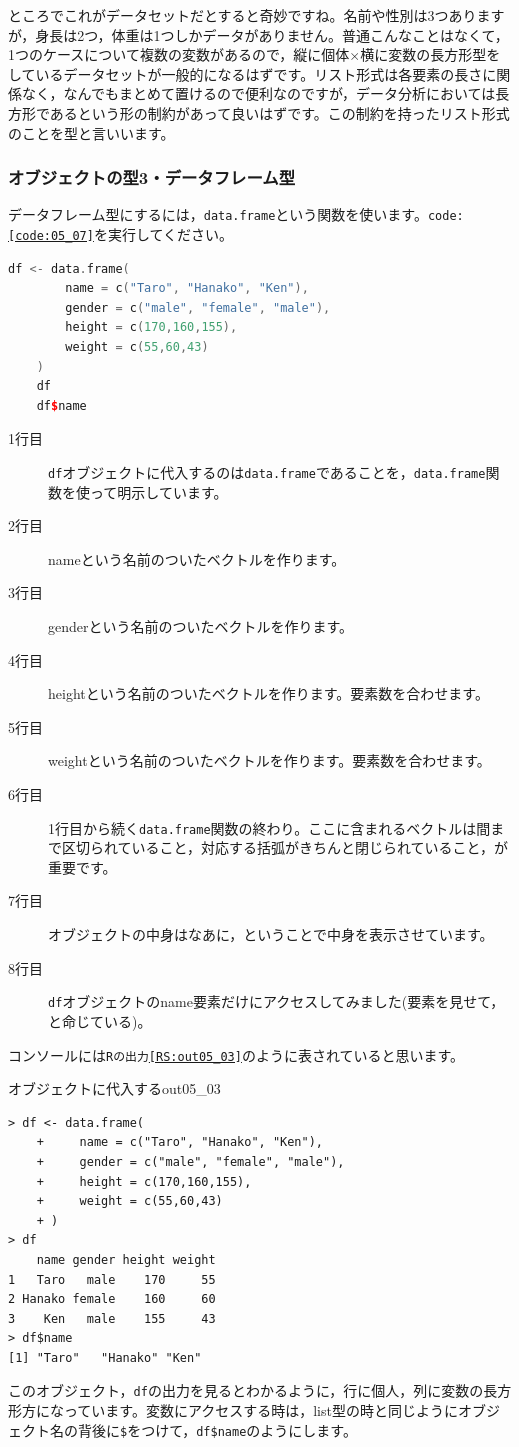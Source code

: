 \documentclass{ltjsbook}
\begin{document}
ところでこれがデータセットだとすると奇妙ですね。名前や性別は3つありますが，身長は2つ，体重は1つしかデータがありません。普通こんなことはなくて，1つのケースについて複数の変数があるので，縦に個体$\times$横に変数の長方形型をしているデータセットが一般的になるはずです。リスト形式は各要素の長さに関係なく，なんでもまとめて置けるので便利なのですが，データ分析においては長方形であるという形の制約があって良いはずです。この制約を持ったリスト形式のことを型と言いいます。
\subsubsection{オブジェクトの型3・データフレーム型}
データフレーム型にするには，\texttt{data.frame}という関数を使います。\texttt{code:\ref{code:05_07}}を実行してください。
\begin{lstlisting}[language=c++,label={code:05_07},caption={データフレーム型}]
	df <- data.frame(
		name = c("Taro", "Hanako", "Ken"),
		gender = c("male", "female", "male"),
		height = c(170,160,155),
		weight = c(55,60,43)
	)
	df
	df$name
\end{lstlisting}
\begin{description}
	\item[1行目] \texttt{df}オブジェクトに代入するのは\texttt{data.frame}であることを，\texttt{data.frame}関数を使って明示しています。
	\item[2行目] nameという名前のついたベクトルを作ります。
	\item[3行目] genderという名前のついたベクトルを作ります。
	\item[4行目] heightという名前のついたベクトルを作ります。要素数を合わせます。
	\item[5行目] weightという名前のついたベクトルを作ります。要素数を合わせます。
	\item[6行目] 1行目から続く\texttt{data.frame}関数の終わり。ここに含まれるベクトルは間まで区切られていること，対応する括弧がきちんと閉じられていること，が重要です。
	\item[7行目] オブジェクトの中身はなあに，ということで中身を表示させています。
	\item[8行目] \texttt{df}オブジェクトのname要素だけにアクセスしてみました(要素を見せて，と命じている)。
\end{description}
コンソールには\texttt{Rの出力\ref{RS:out05_03}}のように表されていると思います。
\begin{Rscreen}{オブジェクトに代入する}{out05_03}
	\begin{verbatim}
> df <- data.frame(
	+     name = c("Taro", "Hanako", "Ken"),
	+     gender = c("male", "female", "male"),
	+     height = c(170,160,155),
	+     weight = c(55,60,43)
	+ )
> df
	name gender height weight
1   Taro   male    170     55
2 Hanako female    160     60
3    Ken   male    155     43
> df$name
[1] "Taro"   "Hanako" "Ken"
\end{verbatim}
\end{Rscreen}
このオブジェクト，\texttt{df}の出力を見るとわかるように，行に個人，列に変数の長方形方になっています。変数にアクセスする時は，list型の時と同じようにオブジェクト名の背後に\verb|$|をつけて，\verb|df$name|のようにします。
\end{document}
